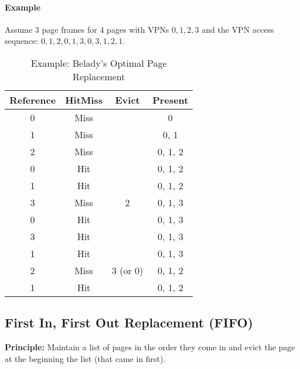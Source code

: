             \paragraph{Example}
                Assume 3 page frames for 4 pages with VPNs \( 0, 1, 2, 3 \) and the VPN access sequence: \( 0, 1, 2, 0, 1, 3, 0, 3, 1, 2, 1 \).
                \begin{table}[H]
                	\centering
                	\begin{tabular}{c|c|c|c}
                		\textbf{Reference} & \textbf{Hit}\textbf{Miss} & \textbf{Evict} & \textbf{Present} \\ \hline
                		        0          &           Miss            &                &        0         \\
                		        1          &           Miss            &                &       0, 1       \\
                		        2          &           Miss            &                &     0, 1, 2      \\
                		        0          &            Hit            &                &     0, 1, 2      \\
                		        1          &            Hit            &                &     0, 1, 2      \\
                		        3          &           Miss            &       2        &     0, 1, 3      \\
                		        0          &            Hit            &                &     0, 1, 3      \\
                		        3          &            Hit            &                &     0, 1, 3      \\
                		        1          &            Hit            &                &     0, 1, 3      \\
                		        2          &           Miss            &    3 (or 0)    &     0, 1, 2      \\
                		        1          &            Hit            &                &     0, 1, 2
                	\end{tabular}
                	\caption{Example: Belady's Optimal Page Replacement}
                \end{table}

        \subsection{First In, First Out Replacement (FIFO)} %
            \textbf{Principle:} Maintain a list of pages in the order they come in and evict the page at the beginning the list (that came in first).
            

